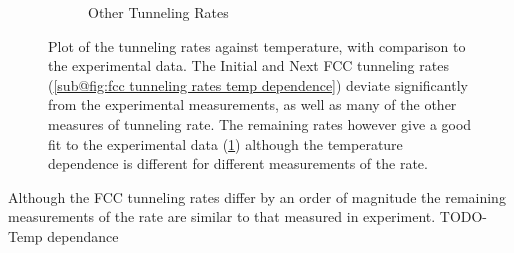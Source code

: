 \begin{figure}[htbp]
\begin{subfigure}{0.45\linewidth}
        \caption{Other Tunneling Rates
        }\label{sub@fig:other tunneling rates temp dependence}
    \end{subfigure}
    \caption{Plot of the tunneling
        rates against temperature, with comparison
        to the experimental data.
        The Initial and Next FCC tunneling rates
        (\cref{sub@fig:fcc tunneling rates temp dependence})
        deviate significantly from the experimental
        measurements, as well as many of the other
        measures of tunneling rate.
        The remaining rates however give
        a good fit to the experimental
        data
        (\cref{sub@fig:other tunneling rates temp dependence})
        although the temperature dependence
        is different for different measurements
        of the rate.
    }\label{fig:tunneling rate against temperature}
\end{figure}
Although the FCC tunneling
rates differ by an order of
magnitude the remaining
measurements of the rate
are similar to that measured
in experiment.
TODO-Temp dependance

